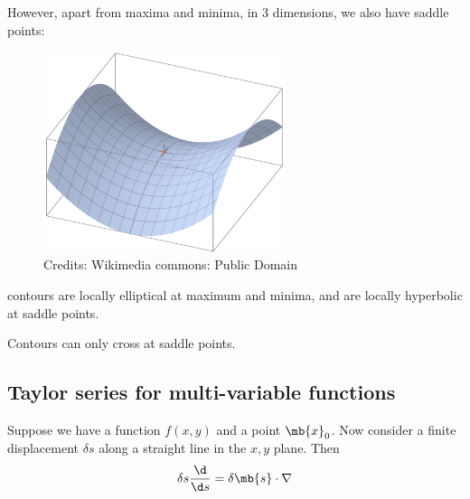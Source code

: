 \documentclass[a4paper]{article}
\begin{document}
However, apart from maxima and minima, in 3 dimensions, we also have saddle points:

\begin{figure}[ht]
  \centering
  \includegraphics[width=200pt]{images/de_22.png}
  \caption*{Credits: Wikimedia commons: Public Domain}
\end{figure}

\note contours are locally elliptical at maximum and minima, and are locally hyperbolic at saddle points.

\note Contours can only cross at saddle points.
\subsection{Taylor series for multi-variable functions}
Suppose we have a function $f(x, y)$ and a point $\mb{x}_0$. Now consider a finite displacement $\delta s$ along a straight line in the $x,y$ plane. Then
\[
\delta s\frac{\d }{\d s} = \delta \mb{s}\cdot \nabla
\]
\end{document}
